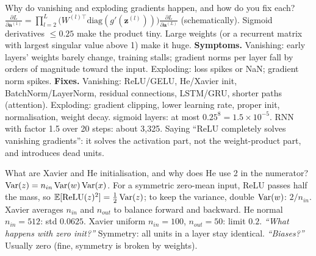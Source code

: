 \begin{qa}{ Why do vanishing and exploding gradients happen, and how do you fix each?}
\why
$\frac{\partial L}{\partial\mathbf a^{(1)}} = \prod_{l=2}^{L}\big(W^{(l)\top}\text{diag}(g'(\mathbf z^{(l)}))\big)\frac{\partial L}{\partial\mathbf a^{(L)}}$ (schematically). Sigmoid
derivatives $\le0.25$ make the product tiny. Large weights (or a recurrent matrix with largest singular value above 1) make it huge.
\textbf{Symptoms.} Vanishing: early layers' weights barely change, training stalls; gradient norms per layer fall by orders of magnitude toward the input.
Exploding: loss spikes or NaN; gradient norm spikes.
\textbf{Fixes.} Vanishing: ReLU/GELU, He/Xavier init, BatchNorm/LayerNorm, residual connections, LSTM/GRU, shorter paths (attention). Exploding: gradient clipping,
lower learning rate, proper init, normalisation, weight decay.
 sigmoid layers: at most $0.25^8 = 1.5\times10^{-5}$. RNN with factor 1.5 over 20 steps: about 3{,}325.
\pitfall Saying ``ReLU completely solves vanishing gradients'': it solves the activation part, not the weight-product part, and introduces dead units.
\end{qa}

\begin{qa}{ What are Xavier and He initialisation, and why does He use 2 in the numerator?}
\why $\operatorname{Var}(z) = n_{in}\operatorname{Var}(w)\operatorname{Var}(x)$. For a symmetric zero-mean input, ReLU passes half the mass, so $\mathbb{E}[\text{ReLU}(z)^2] = \frac12\operatorname{Var}(z)$; to keep the variance, double
$\operatorname{Var}(w)$: $2/n_{in}$. Xavier averages $n_{in}$ and $n_{out}$ to balance forward and backward.
\worked He normal $n_{in} = 512$: std $0.0625$. Xavier uniform $n_{in} = 100$, $n_{out} = 50$: limit $0.2$.
\pushes \emph{``What happens with zero init?''} Symmetry: all units in a layer stay identical. \emph{``Biases?''} Usually zero (fine, symmetry is broken by weights).
\end{qa}

